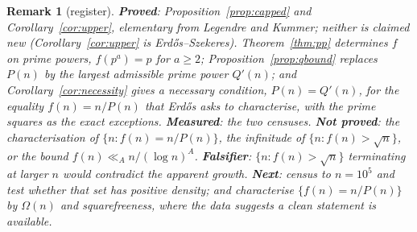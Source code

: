 \documentclass[11pt]{article}
\newtheorem{remark}[theorem]{Remark}
\begin{document}
\begin{remark}[register]
\textbf{Proved}: Proposition~\ref{prop:capped} and Corollary~\ref{cor:upper}, elementary from
Legendre and Kummer; neither is claimed new (Corollary~\ref{cor:upper} is Erd\H{o}s--Szekeres).
Theorem~\ref{thm:pp} determines $f$ on prime powers, $f(p^{a})=p$ for $a\ge2$;
Proposition~\ref{prop:qbound} replaces $P(n)$ by the largest \emph{admissible prime power}
$Q'(n)$; and Corollary~\ref{cor:necessity} gives a necessary condition,
$P(n)=Q'(n)$, for the equality $f(n)=n/P(n)$ that Erd\H{o}s asks to characterise, with the
prime squares as the exact exceptions.
\textbf{Measured}: the two censuses.  \textbf{Not proved}: the characterisation of
$\{n:f(n)=n/P(n)\}$, the infinitude of $\{n:f(n)>\sqrt n\}$, or the bound
$f(n)\ll_A n/(\log n)^{A}$.  \textbf{Falsifier}: $\{n:f(n)>\sqrt n\}$ terminating at larger
$n$ would contradict the apparent growth.  \textbf{Next}: census to $n=10^{5}$ and test
whether that set has positive density; and characterise $\{f(n)=n/P(n)\}$ by $\Omega(n)$ and
squarefreeness, where the data suggests a clean statement is available.
\end{remark}
\end{document}
